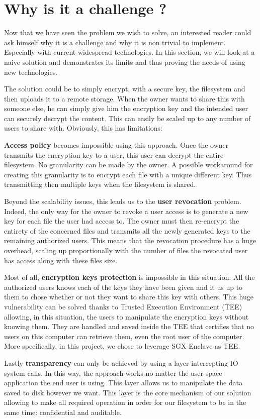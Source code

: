 \documentclass[../main.tex]{subfiles}
\begin{document}
\section{Why is it a challenge ?}
\label{section:problem:why_a_challenge}

\par Now that we have seen the problem we wish to solve, an interested reader could ask himself why it is a challenge and why it is non trivial to implement. Especially with current widespread technologies. In this section, we will look at a naive solution and demonstrates its limits and thus proving the needs of using new technologies.
\par The solution could be to simply encrypt, with a secure key, the filesystem and then uploads it to a remote storage. When the owner wants to share this with someone else, he can simply give him the encryption key and the intended user can securely decrypt the content. This can easily be scaled up to any number of users to share with. Obviously, this has limitations:
\par \textbf{Access policy} becomes impossible using this approach. Once the owner transmits the encryption key to a user, this user can decrypt the entire filesystem. No granularity can be made by the owner. A possible workaround for creating this granularity is to encrypt each file with a unique different key. Thus transmitting then multiple keys when the filesystem is shared.
\par Beyond the scalability issues, this leads us to the \textbf{user revocation} problem. Indeed, the only way for the owner to revoke a user access is to generate a new key for each file the user had access to. The owner must then re-encrypt the entirety of the concerned files and transmits all the newly generated keys to the remaining authorized users. This means that the revocation procedure has a huge overhead, scaling up proportionally with the number of files the revocated user has access along with these files size.
\par Most of all, \textbf{encryption keys protection} is impossible in this situation. All the authorized users knows each of the keys they have been given and it us up to them to chose whether or not they want to share this key with others. This huge vulnerability can be solved thanks to Trusted Execution Environment (TEE) allowing, in this situation, the users to manipulate the encryption keys without knowing them. They are handled and saved inside the TEE that certifies that no users on this computer can retrieve them, even the root user of the computer. More specifically, in this project, we chose to leverage SGX Enclave as TEE.
\par Lastly \textbf{transparency} can only be achieved by using a layer intercepting IO system calls. In this way, the approach works no matter the user-space application the end user is using. This layer allows us to manipulate the data saved to disk however we want. This layer is the core mechanism of our solution allowing to make all required operation in order for our filesystem to be in the same time: confidential and auditable.

\end{document}
